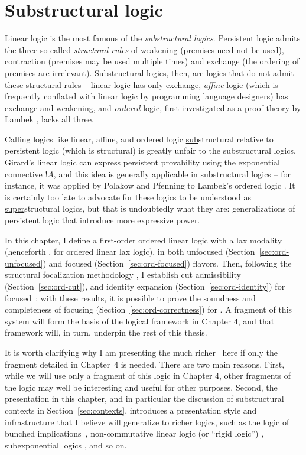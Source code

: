\chapter{Substructural logic}

Linear logic is the most famous of the {\it substructural logics}.
Persistent logic admits the three so-called {\it structural rules} of
weakening (premises need not be used), contraction (premises may be
used multiple times) and exchange (the ordering of premises are
irrelevant). Substructural logics, then, are logics that do not admit
these structural rules -- linear logic has only exchange, {\it affine}
logic (which is frequently conflated with linear logic by programming
language designers) has exchange and weakening, and {\it ordered}
logic, first investigated as a proof theory by Lambek
\cite{lambek58mathematics}, lacks all three.  

Calling logics like
linear, affine, and ordered logic \underline{sub}structural relative
to persistent logic (which is structural) is greatly unfair to the
substructural logics. Girard's linear logic can express persistent
provability using the exponential connective ${!}A$, and this idea is
generally applicable in substructural logics -- for instance, it was
applied by Polakow and Pfenning to Lambek's ordered logic
\cite{polakow99natural}. It is certainly too
late to advocate for these logics to be understood as
\underline{super}structural logics, but that is undoubtedly what they
are: generalizations of persistent logic that introduce more 
expressive power.

In this chapter, I define a first-order ordered linear logic with a
lax modality (henceforth \ollll, for ordered linear lax logic), in
both unfocused (Section~\ref{sec:ord-unfocused}) and focused
(Section~\ref{sec:ord-focused}) flavors. Then, following the
structural focalization methodology \cite{simmons11structural}, I
establish cut admissibility (Section~\ref{sec:ord-cut}), and identity
expansion (Section~\ref{sec:ord-identity}) for focused~\ollll; with
these results, it is possible to prove the soundness and completeness
of focusing (Section~\ref{sec:ord-correctness}) for \ollll.  A
fragment of this system will form the basis of the logical framework
in Chapter 4, and that framework will, in turn, underpin the rest of
this thesis.

It is worth clarifying why I am presenting the much richer \ollll~here
if only the fragment detailed in Chapter~4 is needed. There are two
main reasons.  First, while we will use only a fragment of this logic
in Chapter 4, other fragments of the logic may well be interesting and
useful for other purposes. Second, the presentation in this chapter,
and in particular the discussion of substructural contexts in
Section~\ref{sec:contexts}, introduces a presentation style and
infrastructure that I believe will generalize to richer logics,
such as the logic of bunched implications~\cite{pym02semantics},
non-commutative linear logic (or ``rigid logic'')
\cite{simmons09linear}, subexponential logics
\cite{nigam09algorithmic}, and so on. 

